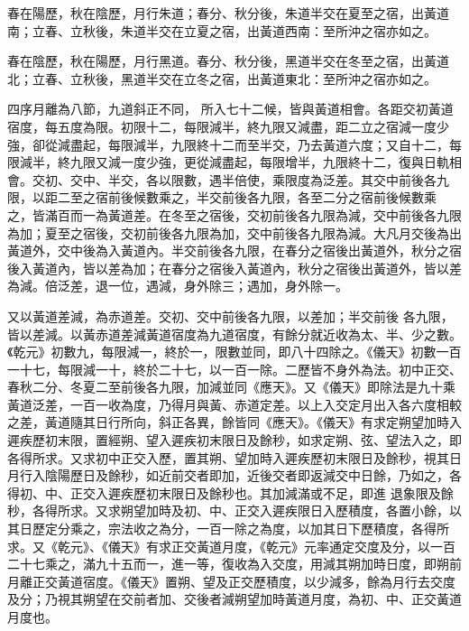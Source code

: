 \begin{pinyinscope}
 春在陽歷，秋在陰歷，月行朱道；春分、秋分後，朱道半交在夏至之宿，出黃道南；立春、立秋後，朱道半交在立夏之宿，出黃道西南：至所沖之宿亦如之。



 春在陰歷，秋在陽歷，月行黑道。春分、秋分後，黑道半交在冬至之宿，出黃道北；立春、立秋後，黑道半交在立冬之宿，出黃道東北：至所沖之宿亦如之。



 四序月離為八節，九道斜正不同，
 所入七十二候，皆與黃道相會。各距交初黃道宿度，每五度為限。初限十二，每限減半，終九限又減盡，距二立之宿減一度少強，卻從減盡起，每限減半，九限終十二而至半交，乃去黃道六度；又自十二，每限減半，終九限又減一度少強，更從減盡起，每限增半，九限終十二，復與日軌相會。交初、交中、半交，各以限數，遇半倍使，乘限度為泛差。其交中前後各九限，以距二至之宿前後候數乘之，半交前後各九限，各至二分之宿前後候數乘
 之，皆滿百而一為黃道差。在冬至之宿後，交初前後各九限為減，交中前後各九限為加；夏至之宿後，交初前後各九限為加，交中前後各九限為減。大凡月交後為出黃道外，交中後為入黃道內。半交前後各九限，在春分之宿後出黃道外，秋分之宿後入黃道內，皆以差為加；在春分之宿後入黃道內，秋分之宿後出黃道外，皆以差為減。倍泛差，退一位，遇減，身外除三；遇加，身外除一。



 又以黃道差減，為赤道差。交初、交中前後各九限，以差加；半交前後
 各九限，皆以差減。以黃赤道差減黃道宿度為九道宿度，有餘分就近收為太、半、少之數。《乾元》初數九，每限減一，終於一，限數並同，即八十四除之。《儀天》初數一百一十七，每限減一十，終於二十七，以一百一除。二歷皆不身外為法。初中正交、春秋二分、冬夏二至前後各九限，加減並同《應天》。又《儀天》即除法是九十乘黃道泛差，一百一收為度，乃得月與黃、赤道定差。以上入交定月出入各六度相較之差，黃道隨其日行所向，斜正各異，餘皆同《應天》。《儀天》有求定朔望加時入遲疾歷初末限，置經朔、望入遲疾初末限日及餘秒，如求定朔、弦、望法入之，即各得所求。又求初中正交入歷，置其朔、望加時入遲疾歷初末限日及餘秒，視其日月行入陰陽歷日及餘秒，如近前交者即加，近後交者即返減交中日餘，乃如之，各得初、中、正交入遲疾歷初末限日及餘秒也。其加減滿或不足，即進
 退象限及餘秒，各得所求。又求朔望加時及初、中、正交入遲疾限日入歷積度，各置小餘，以其日歷定分乘之，宗法收之為分，一百一除之為度，以加其日下歷積度，各得所求。又《乾元》、《儀天》有求正交黃道月度，《乾元》元率通定交度及分，以一百二十七乘之，滿九十五而一，進一等，復收為入交度，用減其朔加時日度，即朔前月離正交黃道宿度。《儀天》置朔、望及正交歷積度，以少減多，餘為月行去交度及分；乃視其朔望在交前者加、交後者減朔望加時黃道月度，為初、中、正交黃道月度也。




\end{pinyinscope}
